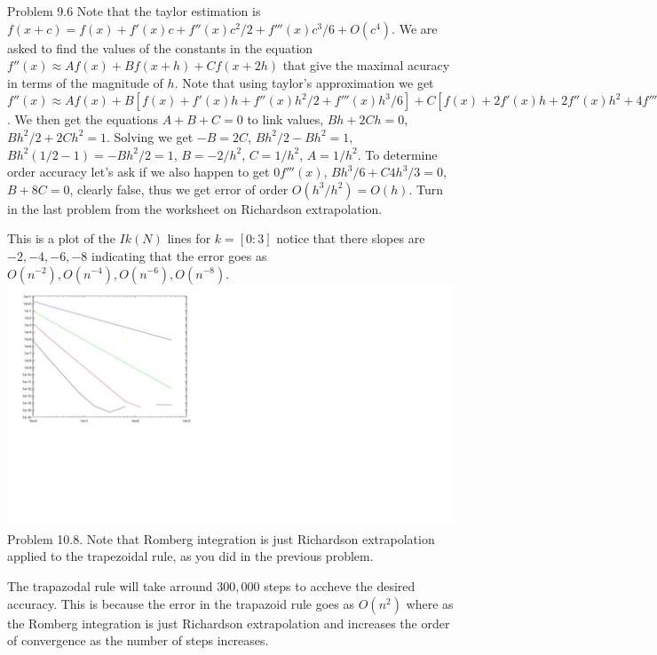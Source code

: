 \documentclass[12pt]{article}
\makeatletter
\theoremstyle{homework}
\newenvironment{exercise}[1]
{\def\@currentlabel{#1}\exercisecore}
{\endexercisecore}
\makeatother
\begin{document}
\begin{exercise}
1
Problem 9.6
\end{exercise}
Note that the taylor estimation is $f(x+c)= f(x) + f'(x)c+ f''(x)c^2/2+f'''(x)c^3/6+O(c^4)$.  We are asked to find the values of the constants in the equation $f''(x)\approx Af(x)+Bf(x+h)+Cf(x+2h)$ that give the maximal acuracy in terms of the magnitude of $h$.  Note that using taylor's approximation we get $f''(x)\approx Af(x)+B[f(x) + f'(x)h+ f''(x)h^2/2+f'''(x)h^3/6]+C[f(x) + 2f'(x)h+ 2f''(x)h^2+4f'''(x)h^3/3]+O(h^4)$.  We then get the equations $A+B+C=0$ to link values, $Bh+2Ch=0$, $Bh^2/2+2Ch^2=1$.  Solving we get $-B=2C$, $Bh^2/2-Bh^2=1$, $Bh^2(1/2-1)=-Bh^2/2=1$, $B=-2/h^2$, $C=1/h^2$, $A=1/h^2$.  To determine order accuracy let's ask if we also happen to get $0f'''(x)$, $Bh^3/6+C4h^3/3=0$, $B+8C=0$, clearly false, thus we get error of order $O(h^3/h^2)=O(h)$.
\begin{exercise}
2
Turn in the last problem from the worksheet on Richardson extrapolation.
\end{exercise}


This is a plot of the $Ik(N)$ lines for $k=[0:3]$ notice that there slopes are $-2,-4,-6,-8$ indicating that the error goes as $O(n^{-2}),O(n^{-4}),O(n^{-6}),O(n^{-8})$.\\
\includegraphics[scale=.6]{../octave/f1.jpg}
\begin{exercise}
3
Problem 10.8. Note that Romberg integration is just Richardson extrapolation applied to the trapezoidal rule, as you did in the previous problem.
\end{exercise}

The trapazodal rule will take arround $300,000$ steps to accheve the desired accuracy.  This is because the error in the trapazoid rule goes as $O(n^2)$ where as the Romberg integration is just Richardson extrapolation and increases the order of convergence as the number of steps increases.
\end{document}
